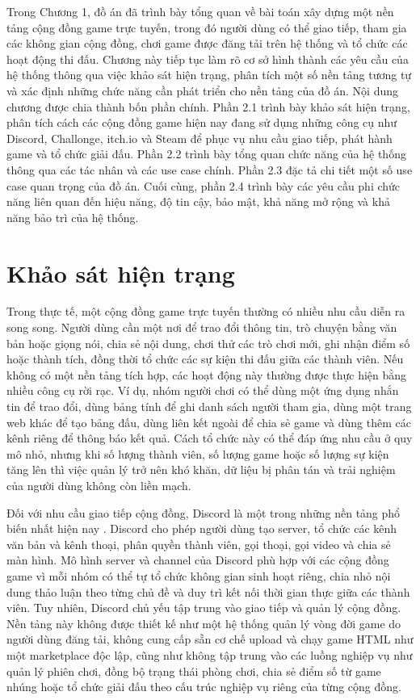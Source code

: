 \documentclass[../DoAn.tex]{subfiles}
\begin{document}
Trong Chương 1, đồ án đã trình bày tổng quan về bài toán xây dựng một nền tảng cộng đồng game trực tuyến, trong đó người dùng có thể giao tiếp, tham gia các không gian cộng đồng, chơi game được đăng tải trên hệ thống và tổ chức các hoạt động thi đấu. Chương này tiếp tục làm rõ cơ sở hình thành các yêu cầu của hệ thống thông qua việc khảo sát hiện trạng, phân tích một số nền tảng tương tự và xác định những chức năng cần phát triển cho nền tảng của đồ án. Nội dung chương được chia thành bốn phần chính. Phần 2.1 trình bày khảo sát hiện trạng, phân tích cách các cộng đồng game hiện nay đang sử dụng những công cụ như Discord, Challonge, itch.io và Steam để phục vụ nhu cầu giao tiếp, phát hành game và tổ chức giải đấu. Phần 2.2 trình bày tổng quan chức năng của hệ thống thông qua các tác nhân và các use case chính. Phần 2.3 đặc tả chi tiết một số use case quan trọng của đồ án. Cuối cùng, phần 2.4 trình bày các yêu cầu phi chức năng liên quan đến hiệu năng, độ tin cậy, bảo mật, khả năng mở rộng và khả năng bảo trì của hệ thống.

\section{Khảo sát hiện trạng}
\label{section:2.1}

Trong thực tế, một cộng đồng game trực tuyến thường có nhiều nhu cầu diễn ra song song. Người dùng cần một nơi để trao đổi thông tin, trò chuyện bằng văn bản hoặc giọng nói, chia sẻ nội dung, chơi thử các trò chơi mới, ghi nhận điểm số hoặc thành tích, đồng thời tổ chức các sự kiện thi đấu giữa các thành viên. Nếu không có một nền tảng tích hợp, các hoạt động này thường được thực hiện bằng nhiều công cụ rời rạc. Ví dụ, nhóm người chơi có thể dùng một ứng dụng nhắn tin để trao đổi, dùng bảng tính để ghi danh sách người tham gia, dùng một trang web khác để tạo bảng đấu, dùng liên kết ngoài để chia sẻ game và dùng thêm các kênh riêng để thông báo kết quả. Cách tổ chức này có thể đáp ứng nhu cầu ở quy mô nhỏ, nhưng khi số lượng thành viên, số lượng game hoặc số lượng sự kiện tăng lên thì việc quản lý trở nên khó khăn, dữ liệu bị phân tán và trải nghiệm của người dùng không còn liền mạch.

Đối với nhu cầu giao tiếp cộng đồng, Discord là một trong những nền tảng phổ biến nhất hiện nay \cite{discord-developer-docs}. Discord cho phép người dùng tạo server, tổ chức các kênh văn bản và kênh thoại, phân quyền thành viên, gọi thoại, gọi video và chia sẻ màn hình. Mô hình server và channel của Discord phù hợp với các cộng đồng game vì mỗi nhóm có thể tự tổ chức không gian sinh hoạt riêng, chia nhỏ nội dung thảo luận theo từng chủ đề và duy trì kết nối thời gian thực giữa các thành viên. Tuy nhiên, Discord chủ yếu tập trung vào giao tiếp và quản lý cộng đồng. Nền tảng này không được thiết kế như một hệ thống quản lý vòng đời game do người dùng đăng tải, không cung cấp sẵn cơ chế upload và chạy game HTML như một marketplace độc lập, cũng như không tập trung vào các luồng nghiệp vụ như quản lý phiên chơi, đồng bộ trạng thái phòng chơi, chia sẻ điểm số từ game nhúng hoặc tổ chức giải đấu theo cấu trúc nghiệp vụ riêng của từng cộng đồng.
\end{document}
